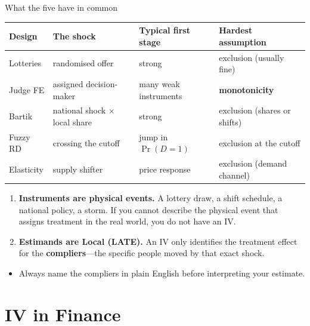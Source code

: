 \documentclass[
  11pt,
  ignorenonframetext,
  aspectratio=169,
]{beamer}
\providecommand{\tightlist}{%
  \setlength{\itemsep}{0pt}\setlength{\parskip}{0pt}}
\begin{document}
\begin{frame}{What the five have in common}
\protect{}\label{what-the-five-have-in-common}
\small

\begin{center}
\begin{tabular}{llll}
\toprule
Design & The shock & Typical first stage & Hardest assumption \\
\midrule
Lotteries        & randomised offer        & strong & exclusion (usually fine) \\
Judge FE         & assigned decision-maker & many weak instruments & \textbf{monotonicity} \\
Bartik           & national shock $\times$ local share & strong & exclusion (shares or shifts) \\
Fuzzy RD         & crossing the cutoff     & jump in $\Pr(D=1)$ & exclusion at the cutoff \\
Elasticity       & supply shifter          & price response & exclusion (demand channel) \\
\bottomrule
\end{tabular}
\end{center}

\vspace{0.4em}

\normalsize

\begin{enumerate}
\tightlist
\item
  \textbf{Instruments are physical events.} A lottery draw, a shift
  schedule, a national policy, a storm. If you cannot describe the
  physical event that assigns treatment in the real world, you do not
  have an IV.
\item
  \textbf{Estimands are Local (LATE).} An IV only identifies the
  treatment effect for the \textbf{compliers}---the specific people
  moved by that exact shock.
\end{enumerate}

\begin{itemize}
\tightlist
\item
  Always name the compliers in plain English before interpreting your
  estimate.
\end{itemize}
\end{frame}

\section{IV in Finance}\label{iv-in-finance}
\end{document}
